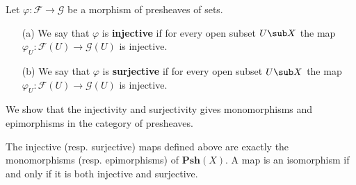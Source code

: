 \begin{definition}
Let $\varphi:\mathscr{F}\to\mathscr{G}$ be a morphism of presheaves of sets.
\begin{itemize}
\item[(a)] We say that $\varphi$ is \textbf{injective} if for every open subset $U\sub X$ the map $\varphi_U:\mathscr{F}(U)\to\mathscr{G}(U)$ is injective.
\item[(b)] We say that $\varphi$ is \textbf{surjective} if for every open subset $U\sub X$ the map $\varphi_U:\mathscr{F}(U)\to\mathscr{G}(U)$ is injective.
\end{itemize}
\end{definition}
We show that the injectivity and surjectivity gives monomorphisms and epimorphisms in the category of presheaves.
\begin{proposition}\label{presheaf mono epi iff injective surjective}
The injective (resp. surjective) maps defined above are exactly the monomorphisms (resp. epimorphisms) of $\mathbf{Psh}(X)$. A map is an isomorphism if and only if it is both injective and surjective.
\end{proposition}
